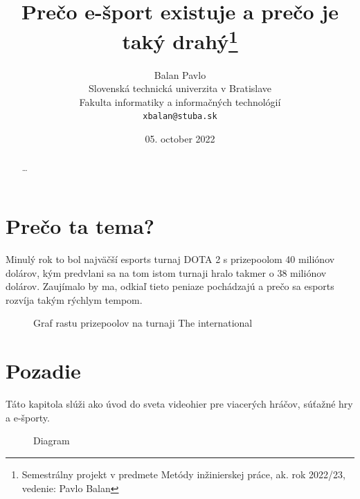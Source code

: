 \documentclass[10pt,twoside,slovak,a4paper]{article}
\title{Prečo e-šport existuje a prečo je taký drahý\thanks{Semestrálny projekt v predmete Metódy inžinierskej práce, ak. rok 2022/23, vedenie: Pavlo Balan}} %
\author{Balan Pavlo\\[2pt]
	{\small Slovenská technická univerzita v Bratislave}\\
	{\small Fakulta informatiky a informačných technológií}\\
	{\small \texttt{xbalan@stuba.sk}}
	}
\date{\small 05. october 2022} %
\begin{document}
\maketitle

\begin{abstract}
\ldots
\end{abstract}



\section{Prečo ta tema?}

Minulý rok to bol najväčší esports turnaj DOTA 2 s prizepoolom 40 miliónov dolárov, kým predvlani sa na tom istom turnaji hralo takmer o 38 miliónov dolárov. Zaujímalo by ma, odkiaľ tieto peniaze pochádzajú a prečo sa esports rozvíja takým rýchlym tempom.

\begin{figure}[h]
	\centering
	\caption{Graf rastu prizepoolov na turnaji The international}
	\label{framework}
\end{figure}

\section{Pozadie} \label{nejaka}

Táto kapitola slúži ako úvod do sveta videohier pre viacerých hráčov, súťažné hry a e-športy.
\begin{figure}[h]
	\centering
	\caption{Diagram}
	\label{framework}
\end{figure}
\end{document}
